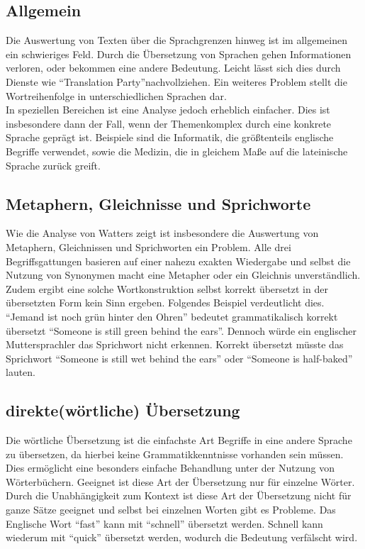 \documentclass[twoside,a4paper]{article}
\begin{document}
\subsection{Allgemein}
Die Auswertung von Texten über die Sprachgrenzen hinweg ist im allgemeinen ein schwieriges Feld. Durch die Übersetzung von Sprachen gehen Informationen verloren, oder bekommen eine andere Bedeutung. Leicht lässt sich dies durch Dienste wie \enquote{Translation Party}\footnotemark nachvollziehen. Ein weiteres Problem stellt die Wortreihenfolge in unterschiedlichen Sprachen dar.\\
In speziellen Bereichen ist eine Analyse jedoch erheblich einfacher. Dies ist insbesondere dann der Fall, wenn der Themenkomplex durch eine konkrete Sprache geprägt ist. Beispiele sind die Informatik, die größtenteils englische Begriffe verwendet, sowie die Medizin, die in gleichem Maße auf die lateinische Sprache zurück greift.\\


\subsection{Metaphern, Gleichnisse und Sprichworte}
\label{Metaphern}
Wie die Analyse von Watters zeigt ist insbesondere die Auswertung von Metaphern, Gleichnissen und Sprichworten ein Problem. Alle drei Begriffsgattungen basieren auf einer nahezu exakten Wiedergabe und selbst die Nutzung von Synonymen macht eine Metapher oder ein Gleichnis unverständlich. Zudem ergibt eine solche Wortkonstruktion selbst korrekt übersetzt in der übersetzten Form kein Sinn ergeben. Folgendes Beispiel verdeutlicht dies.\\
\enquote{Jemand ist noch grün hinter den Ohren} bedeutet grammatikalisch korrekt übersetzt \enquote{Someone is still green behind the ears}. Dennoch würde ein englischer Muttersprachler das Sprichwort nicht erkennen. Korrekt übersetzt müsste das Sprichwort \enquote{Someone is still wet behind the ears} oder \enquote{Someone is half-baked} lauten.

\subsection{direkte(wörtliche) Übersetzung}
\label{direkteUebersetzung}
Die wörtliche Übersetzung ist die einfachste Art Begriffe in eine andere Sprache zu übersetzen, da hierbei keine Grammatikkenntnisse vorhanden sein müssen. Dies ermöglicht eine besonders einfache Behandlung unter der Nutzung von Wörterbüchern. Geeignet ist diese Art der Übersetzung nur für einzelne Wörter.\\
Durch die Unabhängigkeit zum Kontext ist diese Art der Übersetzung nicht für ganze Sätze geeignet und selbst bei einzelnen Worten gibt es Probleme. Das Englische Wort \enquote{fast} kann mit \enquote{schnell} übersetzt werden. Schnell kann wiederum mit \enquote{quick} übersetzt werden, wodurch die Bedeutung verfälscht wird.
\end{document}
